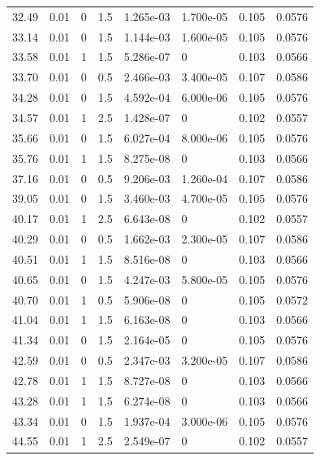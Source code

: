 \documentclass[preview]{standalone}
\begin{document}
{{{\begin{tabular}{L{1.2cm}C{1.2cm} C{0.3cm}C{0.5cm} C{1.4cm}C{1.4cm} C{1.4cm}C{1.4cm}}
  32.49  &  0.01  & 0     & 1.5 &  1.265e-03  & 1.700e-05  & 0.105 &  0.0576   \\ 
  33.14  &  0.01  & 0     & 1.5 &  1.144e-03  & 1.600e-05  & 0.105 &  0.0576   \\ 
  33.58  &  0.01  & 1     & 1.5 &  5.286e-07  & 0  & 0.103 &  0.0566   \\ 
  33.70  &  0.01  & 0     & 0.5 &  2.466e-03  & 3.400e-05  & 0.107 &  0.0586   \\ 
  34.28  &  0.01  & 0     & 1.5 &  4.592e-04  & 6.000e-06  & 0.105 &  0.0576   \\ 
  34.57  &  0.01  & 1     & 2.5 &  1.428e-07  & 0  & 0.102 &  0.0557   \\ 
  35.66  &  0.01  & 0     & 1.5 &  6.027e-04  & 8.000e-06  & 0.105 &  0.0576   \\ 
  35.76  &  0.01  & 1     & 1.5 &  8.275e-08  & 0  & 0.103 &  0.0566   \\ 
  37.16  &  0.01  & 0     & 0.5 &  9.206e-03  & 1.260e-04  & 0.107 &  0.0586   \\ 
  39.05  &  0.01  & 0     & 1.5 &  3.460e-03  & 4.700e-05  & 0.105 &  0.0576   \\ 
  40.17  &  0.01  & 1     & 2.5 &  6.643e-08  & 0  & 0.102 &  0.0557   \\ 
  40.29  &  0.01  & 0     & 0.5 &  1.662e-03  & 2.300e-05  & 0.107 &  0.0586   \\ 
  40.51  &  0.01  & 1     & 1.5 &  8.516e-08  & 0  & 0.103 &  0.0566   \\ 
  40.65  &  0.01  & 0     & 1.5 &  4.247e-03  & 5.800e-05  & 0.105 &  0.0576   \\ 
  40.70  &  0.01  & 1     & 0.5 &  5.906e-08  & 0  & 0.105 &  0.0572   \\ 
  41.04  &  0.01  & 1     & 1.5 &  6.163e-08  & 0  & 0.103 &  0.0566   \\ 
  41.34  &  0.01  & 0     & 1.5 &  2.164e-05  & 0  & 0.105 &  0.0576   \\ 
  42.59  &  0.01  & 0     & 0.5 &  2.347e-03  & 3.200e-05  & 0.107 &  0.0586   \\ 
  42.78  &  0.01  & 1     & 1.5 &  8.727e-08  & 0  & 0.103 &  0.0566   \\ 
  43.28  &  0.01  & 1     & 1.5 &  6.274e-08  & 0  & 0.103 &  0.0566   \\ 
  43.34  &  0.01  & 0     & 1.5 &  1.937e-04  & 3.000e-06  & 0.105 &  0.0576   \\ 
  44.55  &  0.01  & 1     & 2.5 &  2.549e-07  & 0  & 0.102 &  0.0557   \\ 

\end{tabular}}}}
\end{document}
